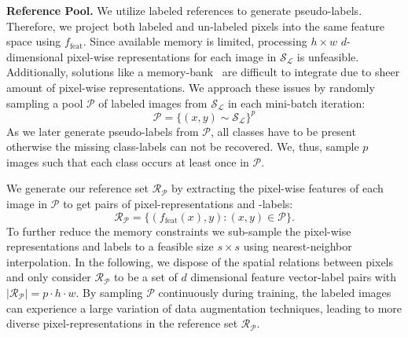 \documentclass[letterpaper]{article} %
\begin{document}
\noindent\textbf{Reference Pool.}
We utilize labeled references to generate pseudo-labels. Therefore, we project both labeled and un-labeled pixels into the same feature space using $f_{\text{feat}}$.
Since available memory is limited, processing $h \times w$ $d$-dimensional pixel-wise representations for each image in $\mathcal{S_L}$ is unfeasible. Additionally, solutions like a memory-bank~\cite{wu2018unsupervised} are difficult to integrate due to sheer amount of pixel-wise representations.
We approach these issues by randomly sampling a pool $\mathcal{P}$ of labeled images from $\mathcal{S_L}$ in each mini-batch iteration:
\begin{equation}
 \mathcal{P}=\{(x,y) \sim \mathcal{S_L}\}^p %
\end{equation}
As we later generate pseudo-labels from $\mathcal{P}$, all classes have to be present otherwise the missing class-labels can not be recovered.
We, thus, sample $p$ images such that each class occurs at least once in $\mathcal{P}$.

We generate our reference set $\mathcal{R}_{\mathcal{P}}$ by extracting the pixel-wise features of each image in $ \mathcal{P}$ to get pairs of pixel-representations and -labels:
\begin{equation}\mathcal{R}_{\mathcal{P}}=\{(f_\text{feat}(x),y): (x,y) \in \mathcal{P}\}.\end{equation} 
To further reduce the memory constraints we sub-sample the pixel-wise representations and labels to a feasible size $s \times s$ using nearest-neighbor interpolation.
In the following, we dispose of the spatial relations between pixels and only consider $\mathcal{R}_{\mathcal{P}}$ to be a set of $d$ dimensional feature vector-label pairs with $|\mathcal{R}_{\mathcal{P}}| = p\cdot h\cdot w$.
 By sampling $\mathcal{P}$ continuously during training, the labeled images can experience a large variation of data augmentation techniques, leading to more diverse pixel-representations in the reference set $\mathcal{R}_{\mathcal{P}}$.


\end{document}
